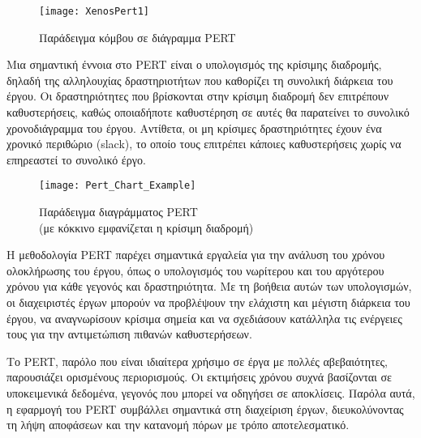             \begin{figure}[h!] \noindent \centering
                \texttt{[image: XenosPert1]}
                \caption{Παράδειγμα κόμβου σε διάγραμμα PERT \cite{Xenos}}
            \end{figure}

            Μια σημαντική έννοια στο PERT είναι ο υπολογισμός της κρίσιμης διαδρομής, δηλαδή της αλληλουχίας δραστηριοτήτων που καθορίζει τη συνολική διάρκεια του έργου. Οι δραστηριότητες που βρίσκονται στην κρίσιμη διαδρομή δεν επιτρέπουν καθυστερήσεις, καθώς οποιαδήποτε καθυστέρηση σε αυτές θα παρατείνει το συνολικό χρονοδιάγραμμα του έργου. Αντίθετα, οι μη κρίσιμες δραστηριότητες έχουν ένα χρονικό περιθώριο (slack), το οποίο τους επιτρέπει κάποιες καθυστερήσεις χωρίς να επηρεαστεί το συνολικό έργο.

            \begin{figure}[h!] \noindent \centering
                \texttt{[image: Pert\_Chart\_Example]}
                \caption{\centering Παράδειγμα διαγράμματος PERT \\ (με κόκκινο εμφανίζεται η κρίσιμη διαδρομή)}
            \end{figure}

            Η μεθοδολογία PERT παρέχει σημαντικά εργαλεία για την ανάλυση του χρόνου ολοκλήρωσης του έργου, όπως ο υπολογισμός του νωρίτερου και του αργότερου χρόνου για κάθε γεγονός και δραστηριότητα. Με τη βοήθεια αυτών των υπολογισμών, οι διαχειριστές έργων μπορούν να προβλέψουν την ελάχιστη και μέγιστη διάρκεια του έργου, να αναγνωρίσουν κρίσιμα σημεία και να σχεδιάσουν κατάλληλα τις ενέργειες τους για την αντιμετώπιση πιθανών καθυστερήσεων.

            Το PERT, παρόλο που είναι ιδιαίτερα χρήσιμο σε έργα με πολλές αβεβαιότητες, παρουσιάζει ορισμένους περιορισμούς. Οι εκτιμήσεις χρόνου συχνά βασίζονται σε υποκειμενικά δεδομένα, γεγονός που μπορεί να οδηγήσει σε αποκλίσεις. Παρόλα αυτά, η εφαρμογή του PERT συμβάλλει σημαντικά στη διαχείριση έργων, διευκολύνοντας τη λήψη αποφάσεων και την κατανομή πόρων με τρόπο αποτελεσματικό. \cite{ProjectManagement21stCentury}

